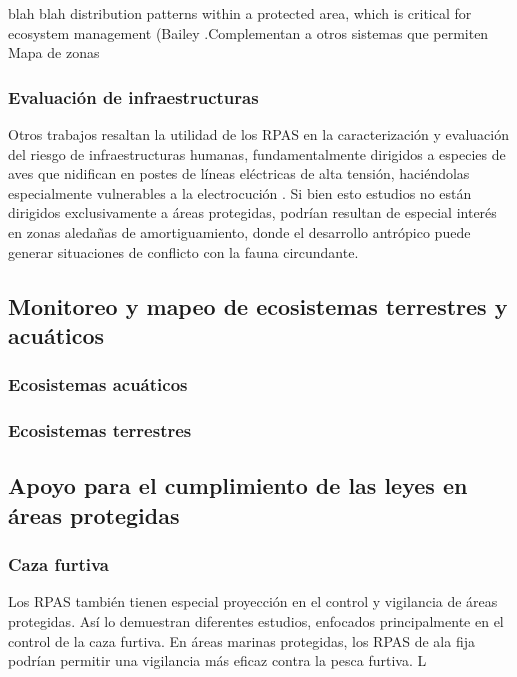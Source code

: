 \documentclass[11pt,]{article}
\begin{document}
\citep{PazmanyMulero2015} blah blah distribution patterns within a
protected area, which is critical for ecosystem management (Bailey
.Complementan a otros sistemas que permiten Mapa de zonas

\subsubsection{Evaluación de
infraestructuras}\label{evaluacion-de-infraestructuras}

Otros trabajos resaltan la utilidad de los RPAS en la caracterización y
evaluación del riesgo de infraestructuras humanas, fundamentalmente
dirigidos a especies de aves que nidifican en postes de líneas
eléctricas de alta tensión, haciéndolas especialmente vulnerables a la
electrocución \citep{Mulero-Pazmany2014a}. Si bien esto estudios no
están dirigidos exclusivamente a áreas protegidas, podrían resultan de
especial interés en zonas aledañas de amortiguamiento, donde el
desarrollo antrópico puede generar situaciones de conflicto con la fauna
circundante.

\subsection{Monitoreo y mapeo de ecosistemas terrestres y
acuáticos}\label{monitoreo-y-mapeo-de-ecosistemas-terrestres-y-acuaticos}

\subsubsection{Ecosistemas acuáticos}\label{ecosistemas-acuaticos}

\subsubsection{Ecosistemas terrestres}\label{ecosistemas-terrestres}

\subsection{Apoyo para el cumplimiento de las leyes en áreas
protegidas}\label{apoyo-para-el-cumplimiento-de-las-leyes-en-areas-protegidas}

\subsubsection{Caza furtiva}\label{caza-furtiva}

Los RPAS también tienen especial proyección en el control y vigilancia
de áreas protegidas. Así lo demuestran diferentes estudios, enfocados
principalmente en el control de la caza furtiva. En áreas marinas
protegidas, los RPAS de ala fija podrían permitir una vigilancia más
eficaz contra la pesca furtiva. L
\end{document}
